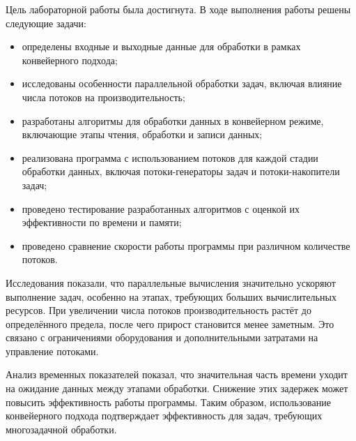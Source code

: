 

\clearpage
{}

Цель лабораторной работы была достигнута. В ходе выполнения работы решены следующие задачи:

\begin{itemize}
    \item определены входные и выходные данные для обработки в рамках конвейерного подхода;
    \item исследованы особенности параллельной обработки задач, включая влияние числа потоков на производительность;
    \item разработаны алгоритмы для обработки данных в конвейерном режиме, включающие этапы чтения, обработки и записи данных;
    \item реализована программа с использованием потоков для каждой стадии обработки данных, включая потоки-генераторы задач и потоки-накопители задач;
    \item проведено тестирование разработанных алгоритмов с оценкой их эффективности по времени и памяти;
    \item проведено сравнение скорости работы программы при различном количестве потоков.
\end{itemize}

Исследования показали, что параллельные вычисления значительно ускоряют выполнение задач, особенно на этапах, требующих больших вычислительных ресурсов. При увеличении числа потоков производительность растёт до определённого предела, после чего прирост становится менее заметным. Это связано с ограничениями оборудования и дополнительными затратами на управление потоками.

Анализ временных показателей показал, что значительная часть времени уходит на ожидание данных между этапами обработки. Снижение этих задержек может повысить эффективность работы программы. Таким образом, использование конвейерного подхода подтверждает эффективность для задач, требующих многозадачной обработки.

